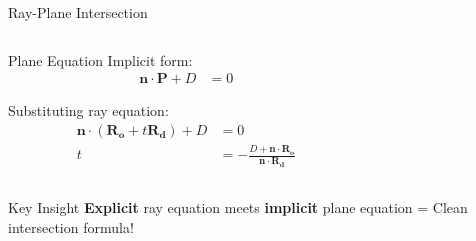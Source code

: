 \begin{frame}{Ray-Plane Intersection}
    \begin{columns}
        \begin{column}{0.5\textwidth}
            \begin{mathbox}{Plane Equation}
                Implicit form:
                \begin{align}
                    \mathbf{n} \cdot \mathbf{P} + D & = 0
                \end{align}

                Substituting ray equation:
                \begin{align}
                    \mathbf{n} \cdot (\mathbf{R_o} + t\mathbf{R_d}) + D & = 0                                                                        \\
                    t                                                   & = -\frac{D + \mathbf{n} \cdot \mathbf{R_o}}{\mathbf{n} \cdot \mathbf{R_d}}
                \end{align}
            \end{mathbox}
        \end{column}
        \begin{column}{0.5\textwidth}
        \end{column}
    \end{columns}

    \begin{conceptbox}{Key Insight}
        \textbf{Explicit} ray equation meets \textbf{implicit} plane equation = Clean intersection formula!
    \end{conceptbox}
\end{frame}

